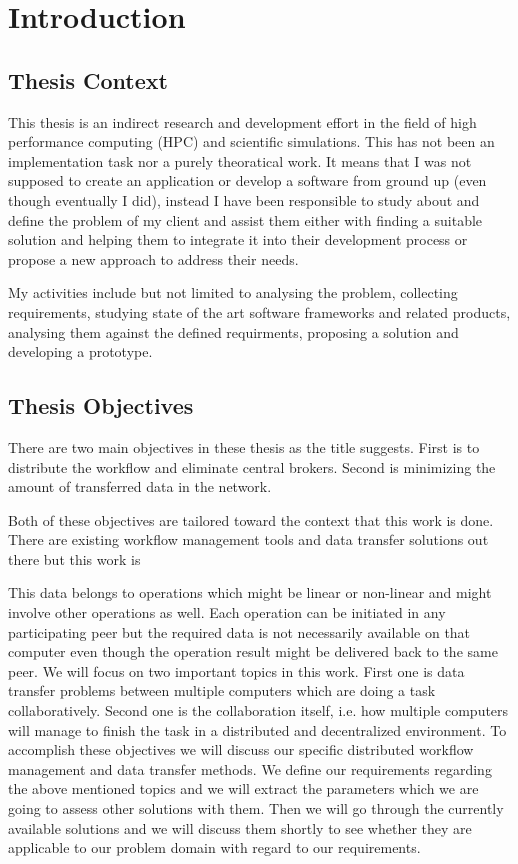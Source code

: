 \chapter{Introduction}
\label{cha:introduction}
\section{Thesis Context}
This thesis is an indirect research and development effort in the field of high performance computing (HPC) and scientific simulations.
This has not been an implementation task nor a purely theoratical work. 
It means that I was not supposed to create an application or develop a software from ground up (even though eventually I did), instead
I have been responsible to study about and define the problem of my client and assist them either with 
finding a suitable solution and helping them to integrate it into their development process or propose a new approach to address their 
needs. 

My activities include but not limited to analysing the problem, collecting requirements,
studying state of the art software frameworks and related products,
analysing them against the defined requirments, proposing a solution and developing a prototype.

\section{Thesis Objectives}
There are two main objectives in these thesis as the title suggests. First is to distribute the workflow and eliminate central brokers.
Second is minimizing the amount of transferred data in the network. 

Both of these objectives are tailored toward the context that this work is done. There are existing workflow management tools
and data transfer solutions out there but this work is 

This data belongs to operations which might be linear or non-linear
and might involve other operations as well. Each operation can be initiated in any participating
peer but the required data is not necessarily available on that computer even though
the operation result might be delivered back to the same peer.
We will focus on two important topics in this work. First one is data transfer problems between multiple 
computers which are doing a task collaboratively. Second one is the collaboration itself, 
i.e. how multiple computers will manage to finish the task in a distributed and decentralized environment.
To accomplish these objectives we will discuss our specific distributed workflow management and data transfer methods. 
We define our requirements regarding the above mentioned topics and we will extract the parameters which we are going
to assess other solutions with them. Then we will go through the currently available solutions and we will discuss them shortly to see
whether they are applicable to our problem domain with regard to our requirements.

